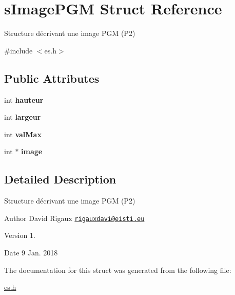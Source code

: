 \hypertarget{structs_image_p_g_m}{}\section{s\+Image\+P\+GM Struct Reference}
\label{structs_image_p_g_m}


Structure décrivant une image P\+GM (P2)  




{\ttfamily \#include $<$es.\+h$>$}

\subsection*{Public Attributes}
\begin{DoxyCompactItemize}
\item 
\mbox{\label{structs_image_p_g_m_a279ca2d304ec535abf850fd9a52e8863}} 
int {\bfseries hauteur}
\item 
\mbox{\label{structs_image_p_g_m_acadef8c95094268e688795988307a442}} 
int {\bfseries largeur}
\item 
\mbox{\label{structs_image_p_g_m_ae48edd2c949f5ee2c1074637162fdaaa}} 
int {\bfseries val\+Max}
\item 
\mbox{\label{structs_image_p_g_m_a28e446738923621479ac9f43501796b7}} 
int $\ast$ {\bfseries image}
\end{DoxyCompactItemize}


\subsection{Detailed Description}
Structure décrivant une image P\+GM (P2) 

\begin{DoxyAuthor}{Author}
David Rigaux \href{mailto:rigauxdavi@eisti.eu}{\tt rigauxdavi@eisti.\+eu} 
\end{DoxyAuthor}
\begin{DoxyVersion}{Version}
1. 
\end{DoxyVersion}
\begin{DoxyDate}{Date}
9 Jan. 2018 
\end{DoxyDate}


The documentation for this struct was generated from the following file\+:\begin{DoxyCompactItemize}
\item 
\mbox{\hyperlink{es_8h}{es.\+h}}\end{DoxyCompactItemize}
